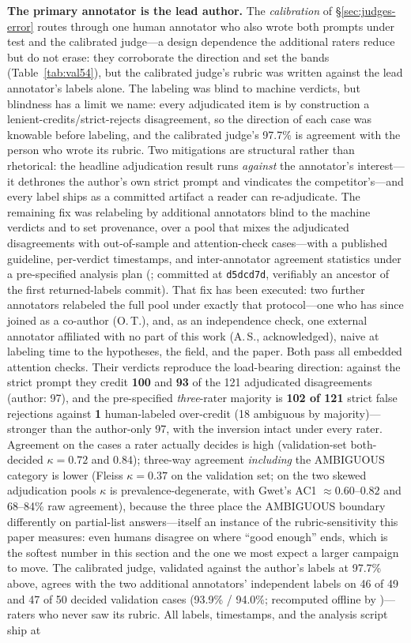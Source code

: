 \documentclass[11pt]{article}
\begin{document}
\textbf{The primary annotator is the lead author.} The \emph{calibration} of \S\ref{sec:judges-error} routes through one human annotator who also wrote both prompts under test and the calibrated judge---a design dependence the additional raters reduce but do not erase: they corroborate the direction and set the bands (Table~\ref{tab:val54}), but the calibrated judge's rubric was written against the lead annotator's labels alone. The labeling was blind to machine verdicts, but blindness has a limit we name: every adjudicated item is by construction a lenient-credits/strict-rejects disagreement, so the direction of each case was knowable before labeling, and the calibrated judge's 97.7\% is agreement with the person who wrote its rubric. Two mitigations are structural rather than rhetorical: the headline adjudication result runs \emph{against} the annotator's interest---it dethrones the author's own strict prompt and vindicates the competitor's---and every label ships as a committed artifact a reader can re-adjudicate. The remaining fix was relabeling by additional annotators blind to the machine verdicts and to set provenance, over a pool that mixes the adjudicated disagreements with out-of-sample and attention-check cases---with a published guideline, per-verdict timestamps, and inter-annotator agreement statistics under a pre-specified analysis plan (; committed at \texttt{d5dcd7d}, verifiably an ancestor of the first returned-labels commit). That fix has been executed: two further annotators relabeled the full pool under exactly that protocol---one who has since joined as a co-author (O.\,T.), and, as an independence check, one external annotator affiliated with no part of this work (A.\,S., acknowledged), naive at labeling time to the hypotheses, the field, and the paper. Both pass all embedded attention checks. Their verdicts reproduce the load-bearing direction: against the strict prompt they credit \textbf{100} and \textbf{93} of the 121 adjudicated disagreements (author: 97), and the pre-specified \emph{three}-rater majority is \textbf{102 of 121} strict false rejections against \textbf{1} human-labeled over-credit (18 ambiguous by majority)---stronger than the author-only 97, with the inversion intact under every rater. Agreement on the cases a rater actually decides is high (validation-set both-decided $\kappa = 0.72$ and $0.84$); three-way agreement \emph{including} the AMBIGUOUS category is lower (Fleiss $\kappa = 0.37$ on the validation set; on the two skewed adjudication pools $\kappa$ is prevalence-degenerate, with Gwet's AC1 $\approx 0.60$--$0.82$ and 68--84\% raw agreement), because the three place the AMBIGUOUS boundary differently on partial-list answers---itself an instance of the rubric-sensitivity this paper measures: even humans disagree on where ``good enough'' ends, which is the softest number in this section and the one we most expect a larger campaign to move. The calibrated judge, validated against the author's labels at 97.7\% above, agrees with the two additional annotators' independent labels on 46 of 49 and 47 of 50 decided validation cases (93.9\% / 94.0\%; recomputed offline by )---raters who never saw its rubric. All labels, timestamps, and the analysis script ship at 
\end{document}
